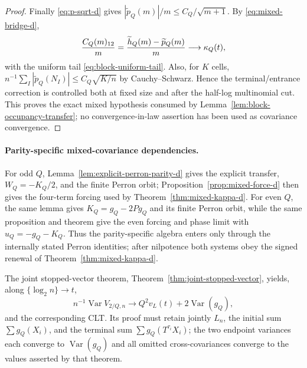 \documentclass[11pt]{article}
\numberwithin{equation}{section}
\newcommand{\1}{\mathbf 1}\newcommand{\F}{\mathcal F}\newcommand{\D}{\mathcal D}
\begin{document}
\begin{proof}
Finally \eqref{eq:p-sqrt-d} gives
$|\widetilde p_Q(m)|/m\le C_Q/\sqrt{m+1}$.  By
\eqref{eq:mixed-bridge-d},
\begin{equation}
 {C_Q(m)_{12}\over m}={\widetilde h_Q(m)-\widetilde p_Q(m)\over m}
 \longrightarrow\kappa_Q(t),                           \label{eq:block-mixed-phase-d}
\end{equation}
with the uniform tail \eqref{eq:block-uniform-tail}.  Also, for $K$ cells,
$n^{-1}\sum_I|\widetilde p_Q(N_I)|\le C_Q\sqrt{K/n}$ by
Cauchy--Schwarz.  Hence the terminal/entrance correction is controlled both
at fixed size and after the half-log multinomial cut.  This proves the exact
mixed hypothesis consumed by Lemma~\ref{lem:block-occupancy-transfer}; no
convergence-in-law assertion has been used as covariance convergence.
\end{proof}

\paragraph{Parity-specific mixed-covariance dependencies.}
For odd $Q$, Lemma~\ref{lem:explicit-perron-parity-d} gives the explicit
transfer, $W_Q=-K_Q/2$, and the finite Perron orbit; Proposition~\ref{prop:mixed-force-d}
then gives the four-term forcing used by Theorem~\ref{thm:mixed-kappa-d}.
For even $Q$, the same lemma gives $K_Q=g_Q-2Pg_Q$ and its finite Perron
orbit, while the same proposition and theorem give the even forcing and
phase limit with $u_Q=-g_Q-K_Q$.  Thus the parity-specific algebra enters
only through the internally stated Perron identities; after nilpotence both
systems obey the signed renewal of Theorem~\ref{thm:mixed-kappa-d}.


The joint stopped-vector theorem, Theorem~\ref{thm:joint-stopped-vector}, yields, along
$\{\log_2n\}\to t$,
\begin{equation}
 n^{-1}\operatorname{Var}V_{2/Q,n}\to Q^2v_L(t)+2\operatorname{Var}(g_Q), \label{eq:res-vphase}
\end{equation}
and the corresponding CLT.  Its proof must retain jointly $L_n$, the initial
sum $\sum g_Q(X_i)$, and the terminal sum $\sum g_Q(T^{\tau_i}X_i)$; the two
endpoint variances each converge to $\operatorname{Var}(g_Q)$ and all omitted
cross-covariances converge to the values asserted by that theorem.
\end{document}
